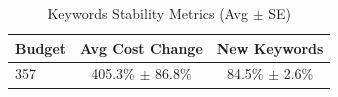 \begin{table}[htbp]
\centering
\caption{Keywords Stability Metrics (Avg $\pm$ SE)}
\begin{tabular}{lcc}
\toprule
Budget & Avg Cost Change & New Keywords \\
\midrule
357 & 405.3\% $\pm$ 86.8\% & 84.5\% $\pm$ 2.6\% \\
\bottomrule
\end{tabular}
\end{table}